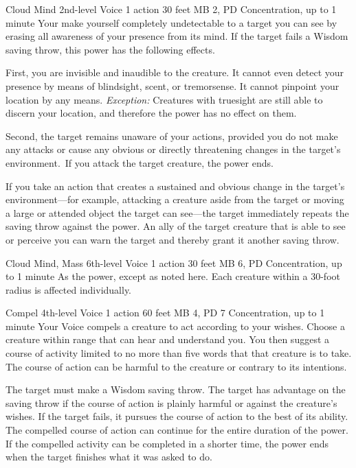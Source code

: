 \DndPowerHeader%
  {Cloud Mind}
  {2nd-level Voice}
  {1 action}
  {30 feet}
  {MB 2, PD \lvltwo}
  {Concentration, up to 1 minute}
Your make yourself completely undetectable to a target
you can see
by erasing all awareness of your presence from its mind.
If the target fails a Wisdom saving throw,
this power has the following effects.

First, you are invisible and inaudible to the creature.
It cannot even detect your presence by means of blindsight,
scent, or tremorsense.
It cannot pinpoint your location by any means.
\textit{Exception:} Creatures with truesight are still
able to discern your location,
and therefore the power has no effect on them.
  
Second, the target remains unaware of your actions,
provided you do not make any attacks or cause any obvious
or directly threatening changes in the target's environment.\
If you attack the target creature, the power ends.
  
If you take an action that creates a sustained and obvious change
in the target's environment---for example, attacking a creature
aside from the target or moving a large or attended object
the target can see---the target immediately repeats the
saving throw against the power.
An ally of the target creature that is able to see or perceive you
can warn the target and thereby grant it another saving throw.

\DndPowerHeader%
  {Cloud Mind, Mass}
  {6th-level Voice}
  {1 action}
  {30 feet}
  {MB 6, PD \lvlsix}
  {Concentration, up to 1 minute}
As the  power,
except as noted here.
Each creature within a 30-foot radius
is affected individually.

\DndPowerHeader%
  {Compel}
  {4th-level Voice}
  {1 action}
  {60 feet}
  {MB 4, PD 7}
  {Concentration, up to 1 minute}
Your Voice compels a creature to act according to your wishes.
Choose a creature within range that can hear and understand you.
You then suggest a course of activity
limited to no more than five words
that that creature is to take.
The course of action can be harmful to the creature
or contrary to its intentions.

The target must make a Wisdom saving throw.
The target has advantage on the saving throw
if the course of action is plainly harmful
or against the creature's wishes.
If the target fails,
it pursues the course of action to the best of its ability.
The compelled course of action can continue for the
entire duration of the power.
If the compelled activity can be completed in a shorter time,
the power ends when the target finishes what it was asked to do.
  
